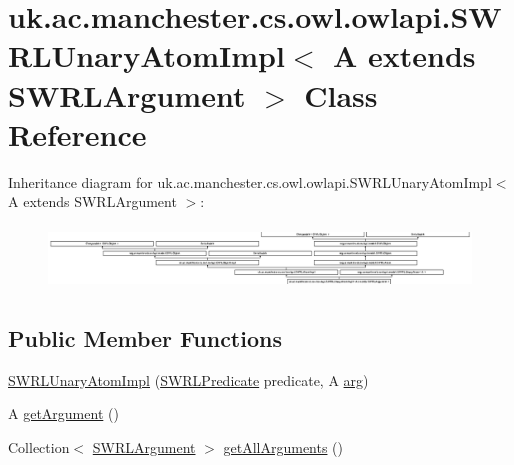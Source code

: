 \hypertarget{classuk_1_1ac_1_1manchester_1_1cs_1_1owl_1_1owlapi_1_1_s_w_r_l_unary_atom_impl_3_01_a_01extends_01_s_w_r_l_argument_01_4}{\section{uk.\-ac.\-manchester.\-cs.\-owl.\-owlapi.\-S\-W\-R\-L\-Unary\-Atom\-Impl$<$ A extends S\-W\-R\-L\-Argument $>$ Class Reference}
\label{classuk_1_1ac_1_1manchester_1_1cs_1_1owl_1_1owlapi_1_1_s_w_r_l_unary_atom_impl_3_01_a_01extends_01_s_w_r_l_argument_01_4}
}
Inheritance diagram for uk.\-ac.\-manchester.\-cs.\-owl.\-owlapi.\-S\-W\-R\-L\-Unary\-Atom\-Impl$<$ A extends S\-W\-R\-L\-Argument $>$\-:\begin{figure}[H]
\begin{center}
\leavevmode
\includegraphics[height=1.693548cm]{classuk_1_1ac_1_1manchester_1_1cs_1_1owl_1_1owlapi_1_1_s_w_r_l_unary_atom_impl_3_01_a_01extends_01_s_w_r_l_argument_01_4}
\end{center}
\end{figure}
\subsection*{Public Member Functions}
\begin{DoxyCompactItemize}
\item 
\hyperlink{classuk_1_1ac_1_1manchester_1_1cs_1_1owl_1_1owlapi_1_1_s_w_r_l_unary_atom_impl_3_01_a_01extends_01_s_w_r_l_argument_01_4_a66ceb6132f7711b5b4917a3bb75e6458}{S\-W\-R\-L\-Unary\-Atom\-Impl} (\hyperlink{interfaceorg_1_1semanticweb_1_1owlapi_1_1model_1_1_s_w_r_l_predicate}{S\-W\-R\-L\-Predicate} predicate, A \hyperlink{classuk_1_1ac_1_1manchester_1_1cs_1_1owl_1_1owlapi_1_1_s_w_r_l_unary_atom_impl_3_01_a_01extends_01_s_w_r_l_argument_01_4_a5fe8279ab169b4c8984ed60d059d6ca4}{arg})
\item 
A \hyperlink{classuk_1_1ac_1_1manchester_1_1cs_1_1owl_1_1owlapi_1_1_s_w_r_l_unary_atom_impl_3_01_a_01extends_01_s_w_r_l_argument_01_4_a6bb3d84e2ca90d2386c734ecd62ed369}{get\-Argument} ()
\item 
Collection$<$ \hyperlink{interfaceorg_1_1semanticweb_1_1owlapi_1_1model_1_1_s_w_r_l_argument}{S\-W\-R\-L\-Argument} $>$ \hyperlink{classuk_1_1ac_1_1manchester_1_1cs_1_1owl_1_1owlapi_1_1_s_w_r_l_unary_atom_impl_3_01_a_01extends_01_s_w_r_l_argument_01_4_ac73665fa9079d65ce58202c57b4007d5}{get\-All\-Arguments} ()
\end{DoxyCompactItemize}
